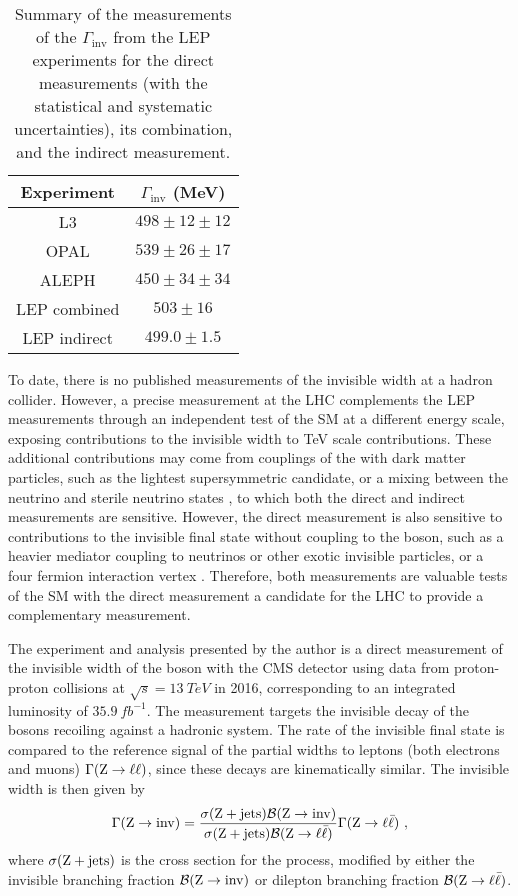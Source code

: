 \begin{table}[htb]
    \centering
    \begin{tabular}{cc}
         \hline\hline
         Experiment & $\Gamma_{\mathrm{inv}}$ (MeV) \\
         \hline
         L3 & $498\pm 12\pm 12$ \\
         OPAL & $539\pm 26\pm 17$ \\
         ALEPH & $450\pm 34\pm 34$ \\
         LEP combined & $503\pm 16$ \\
         \hline
         LEP indirect & $499.0\pm 1.5$ \\
         \hline
    \end{tabular}
    \caption{
        Summary of the measurements of the $\Gamma_{\mathrm{inv}}$ from the LEP experiments for the direct measurements (with the statistical and systematic uncertainties), its combination, and the indirect measurement.
    }
    \label{tab:lep-zinv-width}
\end{table}

To date, there is no published measurements of the \PZ invisible width at a hadron collider. However, a precise measurement at the LHC complements the LEP measurements through an independent test of the SM at a different energy scale, exposing contributions to the invisible width to TeV scale contributions. These additional contributions may come from couplings of the \PZ with dark matter particles, such as the lightest supersymmetric candidate, or a mixing between the neutrino and sterile neutrino states \cite{Carena:2003aj}, to which both the direct and indirect measurements are sensitive. However, the direct measurement is also sensitive to contributions to the invisible final state without coupling to the \PZ boson, such as a heavier mediator coupling to neutrinos or other exotic invisible particles, or a four fermion interaction vertex \cite{Carena:2003aj}.  Therefore, both measurements are valuable tests of the SM with the direct measurement a candidate for the LHC to provide a complementary measurement.

The experiment and analysis presented by the author is a direct measurement of the invisible width of the \PZ boson with the CMS detector using data from proton-proton collisions at ${\sqrt{s}=\SI{13}{TeV}}$ in 2016, corresponding to an integrated luminosity of $\SI{35.9}{fb^{-1}}$. The measurement targets the invisible decay of the \PZ bosons recoiling against a hadronic system. The rate of the invisible final state is compared to the reference signal of the partial widths to leptons (both electrons and muons) $\Gamma(\mathrm{Z}\rightarrow\ell\ell)$, since these decays are kinematically similar. The invisible width is then given by
%
\begin{equation}\label{eq:zinv}
    \Gamma(\IZinv) = \frac{\sigma(\IZj)\mathcal{B}(\IZinv)}{\sigma(\IZj)\mathcal{B}(\IZll)}\Gamma(\IZll)\ ,
\end{equation}
%
where $\sigma({\mathrm{Z}+\mathrm{jets}})$ is the cross section for the \IZj process, modified by either the invisible branching fraction $\mathcal{B}(\mathrm{Z}\rightarrow{\mathrm{inv}})$ or dilepton branching fraction $\mathcal{B}({\mathrm{Z}\rightarrow \ell\bar{\ell}})$.
